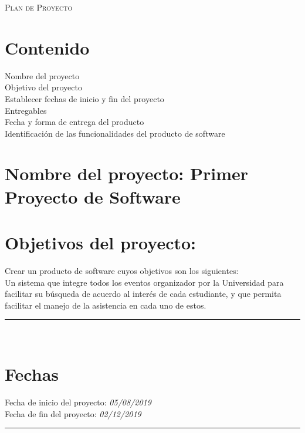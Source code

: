 \documentclass{article}
\newcommand\fecha[3]{\textit{#1/#2/#3}}
\begin{document}


\marginsize{2cm}{2cm}{1cm}{5cm} 

\begin{center}
  {\LARGE \scshape Plan de Proyecto\vspace{10mm} }
\end{center}

\section{Contenido}
Nombre del proyecto\\
\indent Objetivo del proyecto\\
\indent Establecer fechas de inicio y fin del proyecto\\
\indent Entregables\\
\indent Fecha y forma de entrega del producto\\
\indent Identificación de las funcionalidades del producto de software
\newpage


\section{Nombre del proyecto: Primer Proyecto de Software}
\section{Objetivos del proyecto:}
Crear un producto de software cuyos objetivos son los siguientes:\\
Un sistema que integre todos los eventos organizador por la Universidad para
facilitar su búsqueda de acuerdo al interés de cada estudiante, y que permita
facilitar el manejo de la asistencia en cada uno de estos.\\
\rule{1\textwidth}{.8pt}\\

\section{Fechas}
Fecha de inicio del proyecto:\hspace{.64cm} \fecha{05}{08}{2019}\\
\indent Fecha de fin del proyecto: \hspace{1cm}\fecha{02}{12}{2019}\\
\rule{1\textwidth}{.8pt}\\
\end{document}

